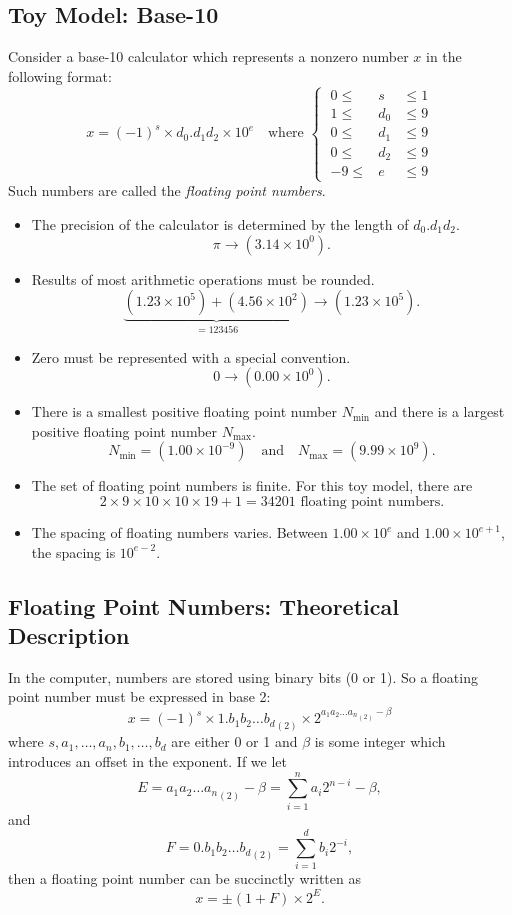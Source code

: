 \documentclass[]{ximera}
\begin{document}
\subsection{Toy Model: Base-10}
\label{sec:org4552e99}
Consider a base-10 calculator which represents a nonzero number $x$ in the following format:
\begin{equation*}
x = (-1)^s \times d_0 . d_1 d_2 \times 10^e
\quad\text{where }
\left\{ \;
\begin{array}{rcl}
 0 \le & s   & \le 1 \\
 1 \le & d_0 & \le 9 \\
 0 \le & d_1 & \le 9 \\
 0 \le & d_2 & \le 9 \\
-9 \le & e   & \le 9
\end{array}
\right.
\end{equation*}
Such numbers are called the \emph{floating point numbers}.

\begin{itemize}
\item The precision of the calculator is determined by the length of $d_0 . d_1 d_2$.
\[
   \pi \longrightarrow (3.14 \times 10^0).
   \]
\item Results of most arithmetic operations must be rounded.
\[
   \underbrace{(1.23 \times 10^5) + (4.56 \times 10^2)}_{=123456} \longrightarrow (1.23 \times 10^5).
   \]
\item Zero must be represented with a special convention.
\[
   0 \longrightarrow (0.00 \times 10^0).
   \]
\item There is a smallest positive floating point number $N_{\text{min}}$ and there is a largest positive floating point number $N_{\text{max}}$.
\[
   N_{\text{min}} = (1.00 \times 10^{-9})
   \quad\text{and}\quad
   N_{\text{max}} = (9.99 \times 10^{9}).
   \]
\item The set of floating point numbers is finite. For this toy model, there are
\[
   2 \times 9 \times 10 \times 10 \times 19 + 1 = 34201 \text{ floating point numbers.}
   \]
\item The spacing of floating numbers varies. Between $1.00 \times 10^e$ and $1.00 \times 10^{e+1}$, the spacing is $10^{e-2}$.
\end{itemize}

\subsection{Floating Point Numbers: Theoretical Description}
\label{sec:orgc9103cd}
In the computer, numbers are stored using binary bits (0 or 1). So a floating point number must be expressed in base 2:
\[
x = (-1)^s \times 1.b_1 b_2 \ldots {b_d}_{(2)} \times 2^{a_1 a_2 \ldots {a_n}_{(2)} - \beta}
\]
where $s, a_1, \ldots, a_n, b_1, \ldots, b_d$ are either 0 or 1 and $\beta$ is some integer which introduces an offset in the exponent. If we let
\[
E = a_1 a_2 \ldots {a_n}_{(2)} - \beta = \sum_{i=1}^n a_i 2^{n-i} - \beta, \tag{exponent}
\]
and
\[
F = 0.b_1 b_2 \ldots {b_d}_{(2)} = \sum_{i=1}^{d} b_i 2^{-i}, \tag{mantissa}
\]
then a floating point number can be succinctly written as
\[
x = \pm (1 + F) \times 2^E.
\]
\end{document}

